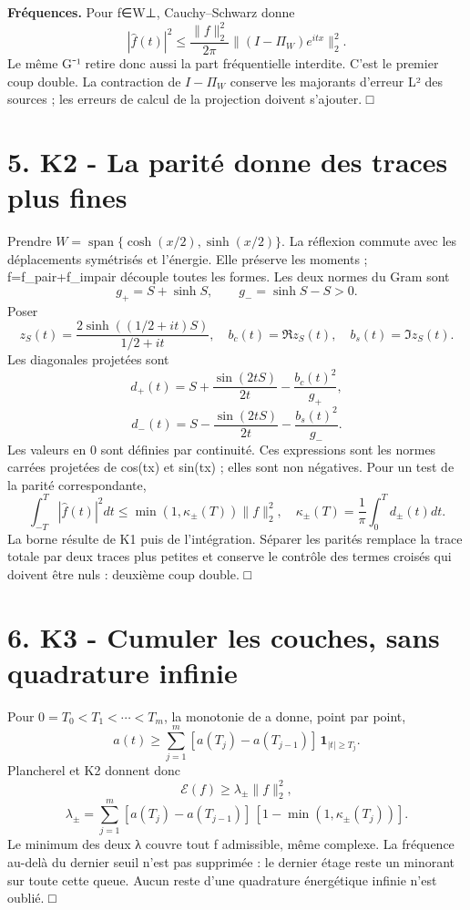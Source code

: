 \documentclass[
  10pt,
  a4paper,
]{article}
\begin{document}
\textbf{Fréquences.} Pour f∈W⊥, Cauchy--Schwarz donne \[
|\widehat f(t)|^2\le\frac{\|f\|_2^2}{2\pi}
\|(I-\Pi_W)e^{itx}\|_2^2.
\] Le même G⁻¹ retire donc aussi la part fréquentielle interdite. C'est
le premier coup double. La contraction de \(I-\Pi_W\) conserve les
majorants d'erreur L² des sources ; les erreurs de calcul de la
projection doivent s'ajouter. □

\hypertarget{k2---la-parituxe9-donne-des-traces-plus-fines}{%
\section{5. K2 - La parité donne des traces plus
fines}\label{k2---la-parituxe9-donne-des-traces-plus-fines}}

Prendre \(W=\operatorname{span}\{\cosh(x/2),\sinh(x/2)\}\). La réflexion
commute avec les déplacements symétrisés et l'énergie. Elle préserve les
moments ; f=f\_pair+f\_impair découple toutes les formes. Les deux
normes du Gram sont \[
g_+=S+\sinh S,\qquad g_-=\sinh S-S>0.
\] Poser \[
z_S(t)=\frac{2\sinh((1/2+it)S)}{1/2+it},\quad
b_c(t)=\Re z_S(t),\quad b_s(t)=\Im z_S(t).
\] Les diagonales projetées sont \[
d_+(t)=S+\frac{\sin(2tS)}{2t}-\frac{b_c(t)^2}{g_+},
\] \[
d_-(t)=S-\frac{\sin(2tS)}{2t}-\frac{b_s(t)^2}{g_-}.
\] Les valeurs en 0 sont définies par continuité. Ces expressions sont
les normes carrées projetées de cos(tx) et sin(tx) ; elles sont non
négatives. Pour un test de la parité correspondante, \[
\int_{-T}^T|\widehat f(t)|^2dt
\le\min(1,\kappa_\pm(T))\|f\|_2^2,
\quad \kappa_\pm(T)=\frac1\pi\int_0^T d_\pm(t)dt.
\] La borne résulte de K1 puis de l'intégration. Séparer les parités
remplace la trace totale par deux traces plus petites et conserve le
contrôle des termes croisés qui doivent être nuls : deuxième coup
double. □

\hypertarget{k3---cumuler-les-couches-sans-quadrature-infinie}{%
\section{6. K3 - Cumuler les couches, sans quadrature
infinie}\label{k3---cumuler-les-couches-sans-quadrature-infinie}}

Pour \(0=T_0<T_1<\cdots<T_m\), la monotonie de a donne, point par point,
\[
a(t)\ge\sum_{j=1}^m[a(T_j)-a(T_{j-1})]\,\mathbf1_{|t|\ge T_j}.
\] Plancherel et K2 donnent donc \[
\mathcal E(f)\ge\lambda_\pm\|f\|_2^2,
\] \[
\lambda_\pm=\sum_{j=1}^m
[a(T_j)-a(T_{j-1})]\,[1-\min(1,\kappa_\pm(T_j))].
\] Le minimum des deux λ couvre tout f admissible, même complexe. La
fréquence au-delà du dernier seuil n'est pas supprimée : le dernier
étage reste un minorant sur toute cette queue. Aucun reste d'une
quadrature énergétique infinie n'est oublié. □
\end{document}
